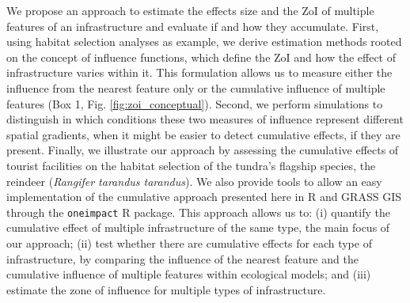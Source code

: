 \documentclass[titlepage]{article}
\begin{document}
We propose an approach to estimate the effects size and the ZoI of multiple features of an infrastructure and evaluate if and how they accumulate. First, using habitat selection analyses as example, we derive estimation methods rooted on the concept of influence functions, which define the ZoI and how the effect of infrastructure varies within it. This formulation allows us to measure either the influence from the nearest feature only or the cumulative influence of multiple features (Box 1, Fig. \ref{fig:zoi_conceptual}). Second, we perform simulations to distinguish in which conditions these two measures of influence represent different spatial gradients, when it might be easier to detect cumulative effects, if they are present. 
Finally, we illustrate our approach by assessing the cumulative effects of tourist facilities on the habitat selection of the tundra's flagship species, the reindeer (\textit{Rangifer tarandus tarandus}). We also provide tools to allow an easy implementation of the cumulative approach presented here in R \citep{r_core_team_r_2020} and GRASS GIS \citep{grass_development_team_geographic_2017} through the \verb|oneimpact| R package. This approach allows us to: (i) quantify the cumulative effect of multiple infrastructure of the same type, the main focus of our approach; (ii) test whether there are cumulative effects for each type of infrastructure, by comparing the influence of the nearest feature and the cumulative influence of multiple features within ecological models; and (iii) estimate the zone of influence for multiple types of infrastructure. 
\end{document}
